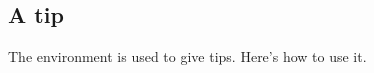 \documentclass[10pt, a4paper]{article}
\begin{document}

\subsection{A tip}

The  environment is used to give tips. Here's how to use it.

\end{document}
